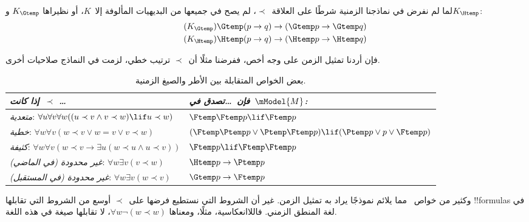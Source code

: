 \documentclass[../../../include/open-logic-section]{subfiles}
\begin{document}


لما لم نفرض في نماذجنا الزمنية شرطًا على العلاقة~$\prec$، لم يصح في جميعها
من البديهيات المألوفة إلا~$K$، أو نظيراها $K_{\Gtemp}$ و$K_{\Htemp}$:
\begin{align*}
\tag{$K_{\Gtemp}$}  \Gtemp (p \to q) & \to (\Gtemp p \to \Gtemp q)\\
\tag{$K_{\Htemp}$}  \Htemp (p \to q) & \to (\Htemp p \to \Htemp q)
\end{align*}

فإن أردنا تمثيل الزمن على وجه أخص، ففرضنا مثلًا أن~$\prec$ ترتيب خطي، لزمت
في النماذج صلاحيات أخرى.

\begin{table}[t]
  \begin{tabular}{| p{} || p{} |}
    \hline
    {\emph{إذا كانت~$\prec$ \dots}} & {\emph{فإن~\dots تصدق في~$\mModel{M}$:}} \\
    \hline \hline
    \emph{متعدية}: \newline
    $\forall u \forall v \forall w ((u \prec v \land v \prec w) \lif u \prec w)$ &
    $\Ftemp \Ftemp p \lif \Ftemp p$  \\
    \hline
    \emph{خطية}: \newline
    $\forall w \forall v (w \prec v \lor w = v \lor v \prec w)$ &
    $(\Ftemp \Ptemp p \lor \Ptemp \Ftemp p) \lif (\Ptemp p \lor p \lor \Ftemp p)$\\
    \hline
    \emph{كثيفة}: \newline
    $\forall w \forall v (w \prec v \to \exists u(w \prec u \land u \prec v))$ &
    $\Ftemp p \lif \Ftemp \Ftemp p$ \\
    \hline
    \emph{غير محدودة (في الماضي)}: \newline
    $\forall w \exists v( v \prec w)$ &
    $\Htemp p \to \Ptemp p$ \\
    \hline
    \emph{غير محدودة (في المستقبل)}: \newline
    $\forall w \exists v( w \prec v)$ &
    $\Gtemp p \to \Ftemp p$ \\
    \hline
  \end{tabular}
  \caption{بعض الخواص المتقابلة بين الأطر والصيغ الزمنية.}
\end{table}

وكثير من خواص~ مما يلائم نموذجًا يراد به تمثيل
الزمن. غير أن الشروط التي نستطيع فرضها على~$\prec$ أوسع من الشروط التي
تقابلها !!{formula}s في لغة المنطق الزمني. فاللاانعكاسية، مثلًا، ومعناها
$\forall w \lnot (w \prec w)$، لا تقابلها صيغة في هذه اللغة.
\end{document}
